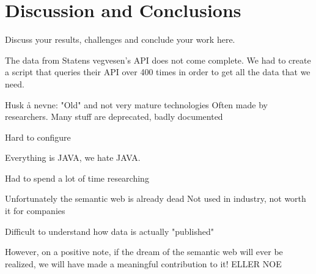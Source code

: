 \chapter{Discussion and Conclusions}

Discuss your results, challenges and conclude your work here.

The data from Statens vegvesen's API \cite{statensvegvesen} does not come complete. We had to create a script that queries their API over 400 times in order to get all the data that we need.


Husk å nevne:
	"Old" and not very mature technologies
	Often made by researchers. Many stuff are deprecated, badly documented

	Hard to configure

	Everything is JAVA, we hate JAVA.

	Had to spend a lot of time researching

	Unfortunately the semantic web is already dead
	Not used in industry, not worth it for companies

	Difficult to understand how data is actually "published"


	However, on a positive note, if the dream of the semantic web will ever be realized, we will have made a meaningful contribution to it! ELLER NOE



